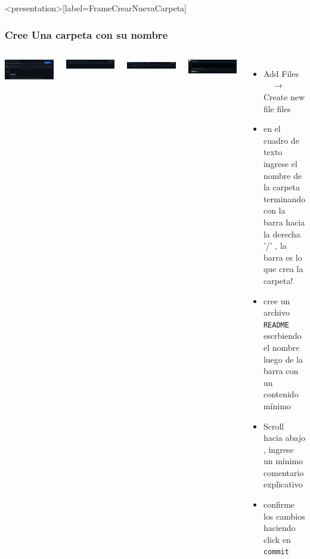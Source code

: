 \begin{frame}<presentation>[label=FrameCrearNuevaCarpeta]
  \frametitle{Cree Una carpeta con su nombre}
  \begin{columns}
      \includegraphics[width=\textwidth]{Screenshots/AddFile_NewFile.png}
      
      \includegraphics[width=\textwidth]{Screenshots/IngreseSuNombredeCarpeta.png}

      \includegraphics[width=\textwidth]{Screenshots/Readme.png}

      \includegraphics[width=\textwidth]{Screenshots/ScrollComment.png}

    \begin{itemize}
      \item Add Files $\quad \rightarrow \quad$  Create new file files
      \item en el cuadro de texto ingrese el nombre de la carpeta terminando con la barra hacia la derecha '/' ,
	la barra es lo que crea la carpeta!
      \item cree un archivo \texttt{README} escrbiendo el nombre luego de la barra con un contenido mínimo
      \item Scroll hacia abajo , ingrese un mínimo comentario explicativo 
      \item confirme los cambios haciendo click en \texttt{commit}
    \end{itemize}
  \end{columns}

\end{frame}

